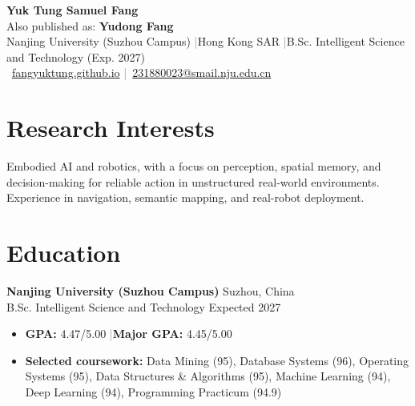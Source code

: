 \documentclass[11pt,a4paper]{article}
\newcommand{\sep}{\hspace{0.5em}\textcolor{gray}{|}\hspace{0.5em}}
\begin{document}
{\LARGE \textbf{Yuk Tung Samuel Fang}}\\[2pt]
{\normalsize Also published as: \textbf{Yudong Fang}}\\[-1pt]
Nanjing University (Suzhou Campus) \sep Hong Kong SAR \sep B.Sc. Intelligent Science and Technology (Exp. 2027)\\[-2pt]
\faGlobe\ \href{https://fangyuktung.github.io/}{fangyuktung.github.io}
\sep \faEnvelope\ \href{mailto:231880023@smail.nju.edu.cn}{231880023@smail.nju.edu.cn}

\section{Research Interests}
Embodied AI and robotics, with a focus on perception, spatial memory, and decision-making for reliable action in unstructured real-world environments. Experience in navigation, semantic mapping, and real-robot deployment.

\section{Education}
\textbf{Nanjing University (Suzhou Campus)} \hfill Suzhou, China\\
B.Sc. Intelligent Science and Technology \hfill Expected 2027
\begin{itemize}
  \item \textbf{GPA:} 4.47/5.00 \sep \textbf{Major GPA:} 4.45/5.00
  \item \textbf{Selected coursework:} Data Mining (95), Database Systems (96), Operating Systems (95), Data Structures \& Algorithms (95), Machine Learning (94), Deep Learning (94), Programming Practicum (94.9)
\end{itemize}
\end{document}
